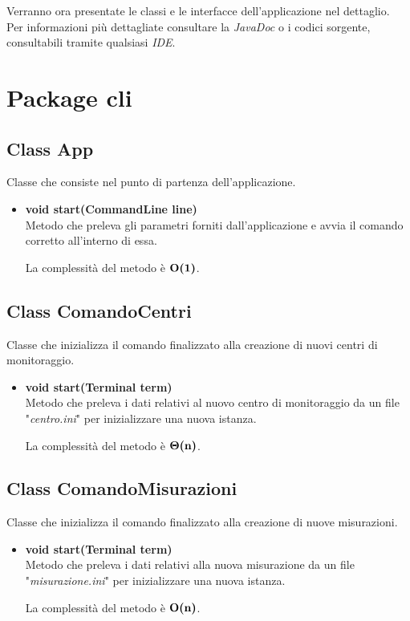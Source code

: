 \documentclass[a4paper, 12pt]{scrreprt}
\begin{document}
	Verranno ora presentate le classi e le interfacce dell'applicazione nel dettaglio. \\Per informazioni più dettagliate consultare la \textsl{JavaDoc} o i codici sorgente, consultabili tramite qualsiasi \textsl{IDE}.
	\pagebreak
		\section{Package cli}
			\subsection{Class App}
			Classe che consiste nel punto di partenza dell'applicazione.
			\begin{itemize}
				\item \textbf{void start(CommandLine line)}
				\\Metodo che preleva gli parametri forniti dall'applicazione e avvia il comando corretto all'interno di essa.

				La complessit\`a del metodo \`e $\mathbf{O}\textbf{(1)}$.
			\end{itemize}

			\subsection{Class ComandoCentri}
			Classe che inizializza il comando finalizzato alla creazione di nuovi centri di monitoraggio.
			\begin{itemize}
				\item \textbf{void start(Terminal term)}
				\\Metodo che preleva i dati relativi al nuovo centro di monitoraggio da un file "\textsl{centro.ini}" per inizializzare una nuova istanza.

				La complessit\`a del metodo \`e $\mathbf{\Theta}\textbf{(n)}$.

			\end{itemize}

			\subsection{Class ComandoMisurazioni}
			Classe che inizializza il comando finalizzato alla creazione di nuove misurazioni.
			\begin{itemize}
				\item \textbf{void start(Terminal term)}
				\\Metodo che preleva i dati relativi alla nuova misurazione da un file "\textsl{misurazione.ini}" per inizializzare una nuova istanza.

				La complessit\`a del metodo \`e $\mathbf{O}\textbf{(n)}$.

			\end{itemize}
\end{document}

